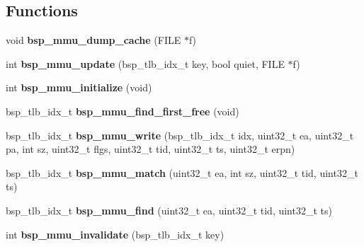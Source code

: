 \subsection*{Functions}
\begin{DoxyCompactItemize}
\item 
\mbox{\label{group__Virtex5MMU_ga4973ad0b91742b14ec5ca6ef8a26eebf}} 
void {\bfseries bsp\+\_\+mmu\+\_\+dump\+\_\+cache} (F\+I\+LE $\ast$f)
\item 
\mbox{\label{group__Virtex5MMU_gab7e0248cc049c644a6651e7d7c1eff91}} 
int {\bfseries bsp\+\_\+mmu\+\_\+update} (bsp\+\_\+tlb\+\_\+idx\+\_\+t key, bool quiet, F\+I\+LE $\ast$f)
\item 
\mbox{\label{group__Virtex5MMU_gab175218f979b05888e9058db2dabbbf5}} 
int {\bfseries bsp\+\_\+mmu\+\_\+initialize} (void)
\item 
\mbox{\label{group__Virtex5MMU_gab9639239ae8b28a22968b37e94b631f4}} 
bsp\+\_\+tlb\+\_\+idx\+\_\+t {\bfseries bsp\+\_\+mmu\+\_\+find\+\_\+first\+\_\+free} (void)
\item 
\mbox{\label{group__Virtex5MMU_gaeaa6846f9ac0019efa89d1c57af29427}} 
bsp\+\_\+tlb\+\_\+idx\+\_\+t {\bfseries bsp\+\_\+mmu\+\_\+write} (bsp\+\_\+tlb\+\_\+idx\+\_\+t idx, uint32\+\_\+t ea, uint32\+\_\+t pa, int sz, uint32\+\_\+t flgs, uint32\+\_\+t tid, uint32\+\_\+t ts, uint32\+\_\+t erpn)
\item 
\mbox{\label{group__Virtex5MMU_ga0cc132bf6a0b7061716615356069ad42}} 
bsp\+\_\+tlb\+\_\+idx\+\_\+t {\bfseries bsp\+\_\+mmu\+\_\+match} (uint32\+\_\+t ea, int sz, uint32\+\_\+t tid, uint32\+\_\+t ts)
\item 
\mbox{\label{group__Virtex5MMU_gad8e577b1e1d21cd4645711613d77ffc5}} 
bsp\+\_\+tlb\+\_\+idx\+\_\+t {\bfseries bsp\+\_\+mmu\+\_\+find} (uint32\+\_\+t ea, uint32\+\_\+t tid, uint32\+\_\+t ts)
\item 
\mbox{\label{group__Virtex5MMU_gaf6c21bfb5788dfa37945e0101eb2e382}} 
int {\bfseries bsp\+\_\+mmu\+\_\+invalidate} (bsp\+\_\+tlb\+\_\+idx\+\_\+t key)
\end{DoxyCompactItemize}
